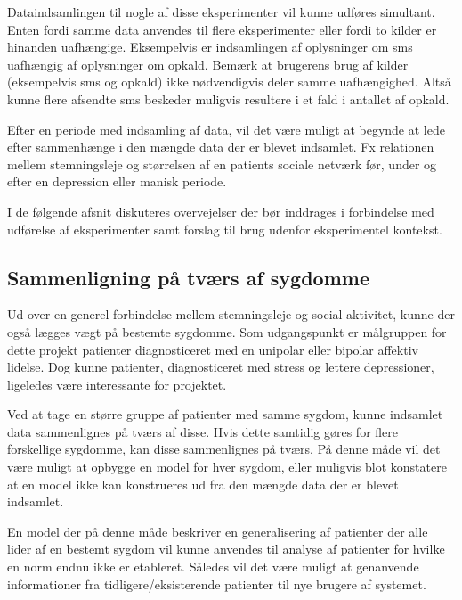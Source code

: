 Dataindsamlingen til nogle af disse eksperimenter vil kunne udføres simultant.
Enten fordi samme data anvendes til flere eksperimenter eller fordi to kilder er hinanden uafhængige.
Eksempelvis er indsamlingen af oplysninger om sms uafhængig af oplysninger om opkald.
Bemærk at brugerens brug af kilder (eksempelvis sms og opkald) ikke nødvendigvis deler samme uafhængighed.
Altså kunne flere afsendte sms beskeder muligvis resultere i et fald i antallet af opkald.

Efter en periode med indsamling af data, vil det være muligt at begynde at lede efter sammenhænge i den mængde data der er blevet indsamlet.
Fx relationen mellem stemningsleje og størrelsen af en patients sociale netværk før, under og efter en depression eller manisk periode.

I de følgende afsnit diskuteres overvejelser der bør inddrages i forbindelse med udførelse af eksperimenter samt forslag til brug udenfor eksperimentel kontekst.

\subsection{Sammenligning på tværs af sygdomme}\label{refleksion:tvaers_af_sygdomme}
Ud over en generel forbindelse mellem stemningsleje og social aktivitet, kunne der også lægges vægt på bestemte sygdomme.
Som udgangspunkt er målgruppen for dette projekt patienter diagnosticeret med en unipolar eller bipolar affektiv lidelse.
Dog kunne patienter, diagnosticeret med stress og lettere depressioner, ligeledes være interessante for projektet.

Ved at tage en større gruppe af patienter med samme sygdom, kunne indsamlet data sammenlignes på tværs af disse.
Hvis dette samtidig gøres for flere forskellige sygdomme, kan disse sammenlignes på tværs.
På denne måde vil det være muligt at opbygge en model for hver sygdom, eller muligvis blot konstatere at en model ikke kan konstrueres ud fra den mængde data der er blevet indsamlet.

En model der på denne måde beskriver en generalisering af patienter der alle lider af en bestemt sygdom vil kunne anvendes til analyse af patienter for hvilke en norm endnu ikke er etableret.
Således vil det være muligt at genanvende informationer fra tidligere/eksisterende patienter til nye brugere af systemet.

